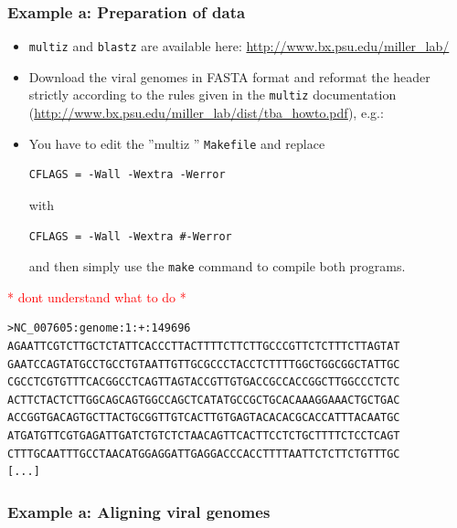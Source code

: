 \documentclass[a4paper]{article}
\newcommand{\frametitle}[1]{\subsubsection{#1}}
\newcommand{\TODO}[1]{{\textcolor{red}{* #1 *}}}
\begin{document}

  \frametitle{Example a: Preparation of data}
  \begin{itemize}
  \item \texttt{multiz} and \texttt{blastz} are available here:
    \url{http://www.bx.psu.edu/miller_lab/}
  \item Download the viral genomes in FASTA format and reformat the header
    strictly according to the rules given in the \texttt{multiz} documentation
    (\url{http://www.bx.psu.edu/miller_lab/dist/tba_howto.pdf}), e.g.:
  \item You have to edit the ''multiz '' \texttt{Makefile} and replace 
\begin{verbatim}
CFLAGS = -Wall -Wextra -Werror
\end{verbatim}
with
\begin{verbatim}
CFLAGS = -Wall -Wextra #-Werror
\end{verbatim}
and then simply use the \texttt{make} command to compile both programs.
  \end{itemize}
\TODO{dont understand what to do}
\small
\begin{verbatim}
>NC_007605:genome:1:+:149696
AGAATTCGTCTTGCTCTATTCACCCTTACTTTTCTTCTTGCCCGTTCTCTTTCTTAGTAT
GAATCCAGTATGCCTGCCTGTAATTGTTGCGCCCTACCTCTTTTGGCTGGCGGCTATTGC
CGCCTCGTGTTTCACGGCCTCAGTTAGTACCGTTGTGACCGCCACCGGCTTGGCCCTCTC
ACTTCTACTCTTGGCAGCAGTGGCCAGCTCATATGCCGCTGCACAAAGGAAACTGCTGAC
ACCGGTGACAGTGCTTACTGCGGTTGTCACTTGTGAGTACACACGCACCATTTACAATGC
ATGATGTTCGTGAGATTGATCTGTCTCTAACAGTTCACTTCCTCTGCTTTTCTCCTCAGT
CTTTGCAATTTGCCTAACATGGAGGATTGAGGACCCACCTTTTAATTCTCTTCTGTTTGC
[...]
\end{verbatim}
\normalsize
  \frametitle{Example a: Aligning viral genomes}
\end{document}
